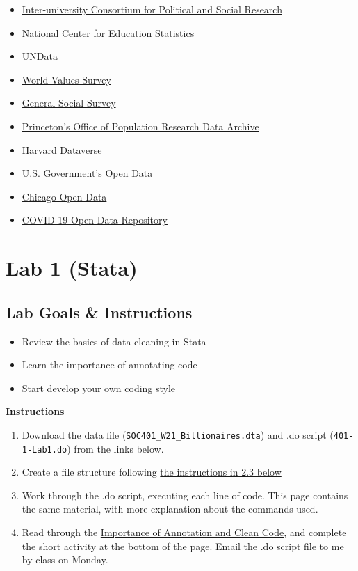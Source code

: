 \documentclass[
]{book}
\providecommand{\tightlist}{%
  \setlength{\itemsep}{0pt}\setlength{\parskip}{0pt}}
\begin{document}
\begin{itemize}
\tightlist
\item
  \href{https://www.icpsr.umich.edu/}{Inter-university Consortium for Political and Social Research}
\item
  \href{https://nces.ed.gov/}{National Center for Education Statistics}
\item
  \href{https://data.un.org/}{UNData}
\item
  \href{http://www.worldvaluessurvey.org/}{World Values Survey}
\item
  \href{https://gssdataexplorer.norc.org/}{General Social Survey}
\item
  \href{https://opr.princeton.edu/archive/}{Princeton's Office of Population Research Data Archive}
\item
  \href{https://dataverse.harvard.edu/}{Harvard Dataverse}
\item
  \href{https://www.data.gov/}{U.S. Government's Open Data}
\item
  \href{https://data.cityofchicago.org/}{Chicago Open Data}
\item
  \href{https://health.google.com/covid-19/open-data/}{COVID-19 Open Data Repository}
\end{itemize}

\hypertarget{lab-1-stata}{%
\chapter{Lab 1 (Stata)}\label{lab-1-stata}}

\hypertarget{lab-goals-instructions}{%
\section{Lab Goals \& Instructions}\label{lab-goals-instructions}}

\begin{itemize}
\tightlist
\item
  Review the basics of data cleaning in Stata\\
\item
  Learn the importance of annotating code
\item
  Start develop your own coding style
\end{itemize}

\textbf{Instructions}

\begin{enumerate}
\def\labelenumi{\arabic{enumi}.}
\tightlist
\item
  Download the data file (\texttt{SOC401\_W21\_Billionaires.dta}) and .do script (\texttt{401-1-Lab1.do}) from the links below.
\item
  Create a file structure following \protect\hyperlink{file}{the instructions in 2.3 below}
\item
  Work through the .do script, executing each line of code. This page contains the same material, with more explanation about the commands used.
\item
  Read through the \protect\hyperlink{clean}{Importance of Annotation and Clean Code}, and complete the short activity at the bottom of the page. Email the .do script file to me by class on Monday.
\end{enumerate}
\end{document}
